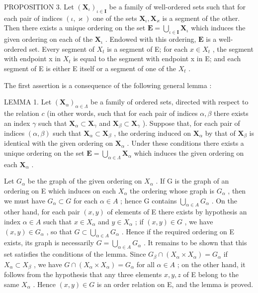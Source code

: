 PROPOSITION 3. Let \((\mathbf{X}_{\iota})_{\iota \in \mathbf{I}}\) be a family of well-ordered sets such that for each pair of indices \((\iota, \varkappa)\) one of the sets \(\mathbf{X}_{\iota}, \mathbf{X}_{\varkappa}\) is a segment of the other. Then there exists a unique ordering on the set \(\mathbf{E} = \bigcup_{\iota \in \mathbf{I}} \mathbf{X}_{\iota}\) which induces the given ordering on each of the \(\mathbf{X}_{\iota}\) . Endowed with this ordering, \(\mathbf{E}\) is a well-ordered set. Every segment of \(X_{t}\) is a segment of E; for each \(x \in X_{t}\) , the segment with endpoint x in \(X_{t}\) is equal to the segment with endpoint x in E; and each segment of E is either E itself or a segment of one of the \(X_{t}\) .

The first assertion is a consequence of the following general lemma :

LEMMA 1. Let \((\mathbf{X}_{\alpha})_{\alpha \in \Lambda}\) be a family of ordered sets, directed with respect to the relation \(c\) (in other words, such that for each pair of indices \(\alpha, \beta\) there exists an index \(\gamma\) such that \(\mathbf{X}_{\alpha} \subset \mathbf{X}_{\gamma}\) and \(\mathbf{X}_{\beta} \subset \mathbf{X}_{\gamma}\) ). Suppose that, for each pair of indices \((\alpha, \beta)\) such that \(\mathbf{X}_{\alpha} \subset \mathbf{X}_{\beta}\) , the ordering induced on \(\mathbf{X}_{\alpha}\) by that of \(\mathbf{X}_{\beta}\) is identical with the given ordering on \(\mathbf{X}_{\alpha}\) . Under these conditions there exists a unique ordering on the set \(\mathbf{E} = \bigcup_{\alpha \in \Lambda} \mathbf{X}_{\alpha}\) which induces the given ordering on each \(\mathbf{X}_{\alpha}\) .

Let \(G_{\alpha}\) be the graph of the given ordering on \(X_{\alpha}\) . If G is the graph of an ordering on E which induces on each \(X_{\alpha}\) the ordering whose graph is \(G_{\alpha}\) , then we must have \(G_{\alpha} \subset G\) for each \(\alpha \in A\) ; hence G contains \(\bigcup_{\alpha \in A} G_{\alpha}\) . On the other hand, for each pair \((x, y)\) of elements of E there exists by hypothesis an index \(\alpha \in A\) such that \(x \in X_{\alpha}\) and \(y \in X_{\alpha}\) ; if \((x, y) \in G\) , we have \((x, y) \in G_{\alpha}\) , so that \(G \subset \bigcup_{\alpha \in A} G_{\alpha}\) . Hence if the required ordering on E exists, its graph is necessarily \(G = \bigcup_{\alpha \in A} G_{\alpha}\) . It remains to be shown that this set satisfies the conditions of the lemma. Since \(G_{\beta} \cap (X_{\alpha} \times X_{\alpha}) = G_{\alpha}\) if \(X_{\alpha} \subset X_{\beta}\) , we have \(G \cap (X_{\alpha} \times X_{\alpha}) = G_{\alpha}\) for all \(\alpha \in A\) ; on the other hand, it follows from the hypothesis that any three elements \(x, y, z\) of E belong to the same \(X_{\alpha}\) . Hence \((x, y) \in G\) is an order relation on E, and the lemma is proved.

